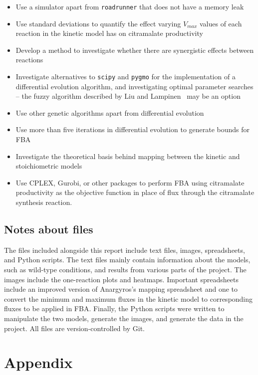 \documentclass[parskip=full, numbers=noenddot]{scrreprt}
\begin{document}
\begin{itemize}
\item Use a simulator apart from \texttt{roadrunner} that does not have a memory leak
\item Use standard deviations to quantify the effect varying $V_{max}$ values of each reaction in the kinetic model has on citramalate productivity
\item Develop a method to investigate whether there are synergistic effects between reactions
\item Investigate alternatives to \texttt{scipy} and \texttt{pygmo} for the implementation of a differential evolution algorithm, and investigating optimal parameter searches -- the fuzzy algorithm described by Liu and Lampinen~\cite{liu_fuzzy_2005} may be an option
\item Use other genetic algorithms apart from differential evolution
\item Use more than five iterations in differential evolution to generate bounds for FBA
\item Investigate the theoretical basis behind mapping between the kinetic and stoichiometric models
  \item Use CPLEX, Gurobi, or other packages to perform FBA using citramalate productivity as the objective function in place of flux through the citramalate synthesis reaction.
\end{itemize}
  
\section{Notes about files}
\label{sec:files}

The files included alongside this report include text files, images, spreadsheets, and Python scripts. The text files mainly contain information about the models, such as wild-type conditions, and results from various parts of the project. The images include the one-reaction plots and heatmaps. Important spreadsheets include an improved version of Anargyros's mapping spreadsheet and one to convert the minimum and maximum fluxes in the kinetic model to corresponding fluxes to be applied in FBA. Finally, the Python scripts were written to manipulate the two models, generate the images, and generate the data in the project. All files are version-controlled by Git.

\appendix
\chapter*{Appendix}
\renewcommand{\thesection}{\Alph{section}}
\end{document}
